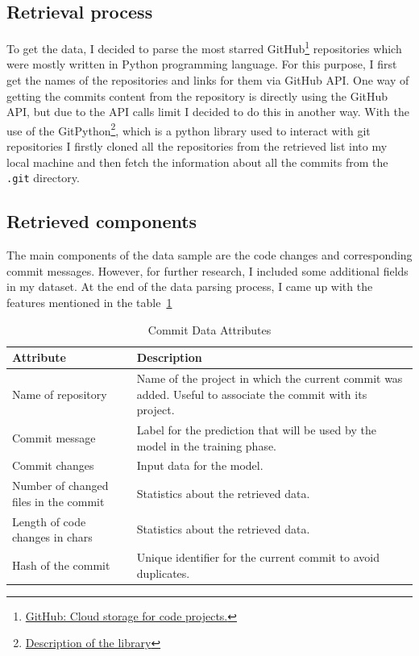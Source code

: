 \subsection{Retrieval process}
 To get the data, I decided to parse the most starred GitHub\footnote[1]{\href{https://github.com}{GitHub: Cloud storage for code projects.}} repositories which were mostly written in Python programming language. For this purpose, I first get the names of the repositories and links for them via GitHub API\@. One way of getting the commits content from the repository is directly using the GitHub API, but due to the API calls limit I decided to do this in another way. With the use of the GitPython\footnote[2]{\href{https://pypi.org/project/GitPython/}{Description of the library}}, which is a python library used to interact with git repositories I firstly cloned all the repositories from the retrieved list into my local machine and then fetch the information about all the commits from the \texttt{.git} directory. 

 \subsection{Retrieved components}
 The main components of the data sample are the code changes and corresponding commit messages. However, for further research, I included some additional fields in my dataset. At the end of the data parsing process, I came up with the features mentioned in the table~{}\ref{table:commit_data_attributes}

{ 
    \renewcommand{\arraystretch}{2} %
    \begin{table}[h]
    \caption{Commit Data Attributes}\label{table:commit_data_attributes}
    \centering
    \begin{tabularx}{\textwidth}{|l|X|} %
    \hline %
    \textbf{Attribute} & \textbf{Description} \\
    \hline %
    Name of repository & Name of the project in which the current commit was added. Useful to associate the commit with its project. \\
    \hline %
    Commit message & Label for the prediction that will be used by the model in the training phase. \\
    \hline %
    Commit changes & Input data for the model. \\
    \hline %
    Number of changed files in the commit & Statistics about the retrieved data. \\
    \hline %
    Length of code changes in chars & Statistics about the retrieved data. \\
    \hline %
    Hash of the commit & Unique identifier for the current commit to avoid duplicates. \\
    \hline %
    \end{tabularx}
\end{table}
}
    
